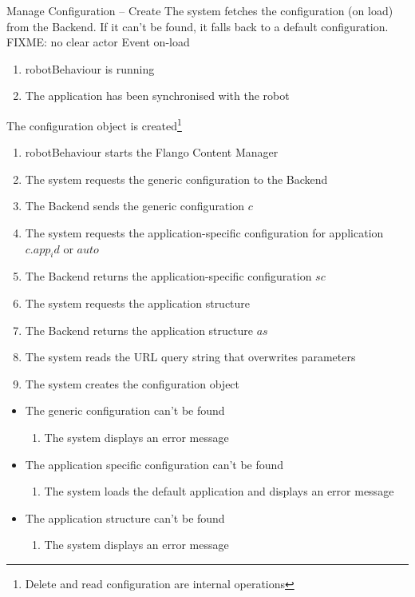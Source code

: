 \begin{suc}
{Manage Configuration -- Create}
{The system fetches the configuration (on load) from the Backend. If it can't be found, it falls back to a default configuration. FIXME: no clear actor}
{Event on-load}
{
	\begin{enumerate}
        \item robotBehaviour is running
        \item The application has been synchronised with the robot
    \end{enumerate}}
{
The configuration object is created\footnote{Delete and read configuration are internal operations}
}
{
    \begin{enumerate}
        \item robotBehaviour starts the Flango Content Manager
        \item The system requests the generic configuration to the Backend
		\item The Backend sends the generic configuration $c$
		\item The system requests the application-specific configuration for application $c.app_id$ or $auto$
		\item The Backend returns the application-specific configuration $sc$
		\item The system requests the application structure
		\item The Backend returns the application structure $as$
		\item The system reads the URL query string that overwrites parameters
		\item The system creates the configuration object
    \end{enumerate}
}
{    
	\begin{itemize}
        \item The generic configuration can't be found
        \begin{enumerate}
        	\item The system displays an error message
    	\end{enumerate}
    	\item The application specific configuration can't be found
        \begin{enumerate}
        	\item The system loads the default application and displays an error message
    	\end{enumerate}
    	\item The application structure can't be found
        \begin{enumerate}
        	\item The system displays an error message
    	\end{enumerate}
    \end{itemize}   
}
\end{suc}

